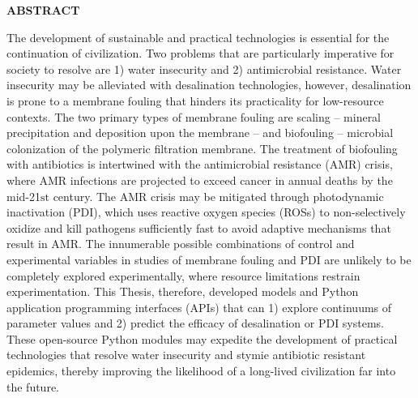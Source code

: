 \newpage
{}


\begin{center}
    \textbf{ABSTRACT}
\end{center}
\begin{justify}
    The development of sustainable and practical technologies is essential for the continuation of civilization. Two problems that are particularly imperative for society to resolve are 1) water insecurity and 2) antimicrobial resistance. Water insecurity may be alleviated with desalination technologies, however, desalination is prone to a membrane fouling that hinders its practicality for low-resource contexts. The two primary types of membrane fouling are scaling -- mineral precipitation and deposition upon the membrane -- and biofouling -- microbial colonization of the polymeric filtration membrane. The treatment of biofouling with antibiotics is intertwined with the antimicrobial resistance (AMR) crisis, where AMR infections are projected to exceed cancer in annual deaths by the mid-21$\text{st}$ century. The AMR crisis may be mitigated through photodynamic inactivation (PDI), which uses reactive oxygen species (ROSs) to non-selectively oxidize and kill pathogens sufficiently fast to avoid adaptive mechanisms that result in AMR. The innumerable possible combinations of control and experimental variables in studies of membrane fouling and PDI are unlikely to be completely explored experimentally, where resource limitations restrain experimentation. This Thesis, therefore, developed models and Python application programming interfaces (APIs) that can 1) explore continuums of parameter values and 2) predict the efficacy of desalination or PDI systems. These open-source Python modules may expedite the development of practical technologies that resolve water insecurity and stymie antibiotic resistant epidemics, thereby improving the likelihood of a long-lived civilization far into the future. 
\end{justify}

\tableofcontents
{}\listoftables
\setcounter{lofdepth}{2}
\listoffigures


\newpage
\pagestyle{myheadings}

